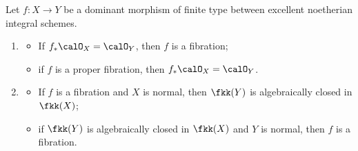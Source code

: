 \begin{proposition}\label{prop:equivalent_definitions_of_fibrations}
	Let $f: X \to Y$ be a dominant morphism of finite type between excellent noetherian integral schemes.
	\begin{enumerate}
		\item \begin{itemize}[leftmargin=1em,nosep]
			      \item If $f_*\calO_X = \calO_Y$, then $f$ is a fibration;
			      \item if $f$ is a proper fibration, then $f_*\calO_X = \calO_Y$.
		      \end{itemize}
		\item \begin{itemize}[leftmargin=1em,nosep]
			      \item If $f$ is a fibration and $X$ is normal, then $\fkk(Y)$ is algebraically closed in $\fkk(X)$;
			      \item if $\fkk(Y)$ is algebraically closed in $\fkk(X)$ and $Y$ is normal, then $f$ is a fibration.
		      \end{itemize}
	\end{enumerate}
\end{proposition}

